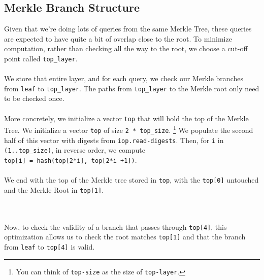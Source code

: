 \documentclass[10pt,letterpaper,titlepage]{article}
\theoremstyle{definition}
\begin{document}
\begin{appendices}
\subsection*{Merkle Branch Structure}
\label{merkle branch}
Given that we're doing lots of queries from the same Merkle Tree, these queries are expected to have quite a bit of overlap close to the root. 
To minimize computation, rather than checking all the way to the root, we choose a cut-off point called \texttt{top\_layer}.\\
\\
We store that entire layer, and for each query, we check our Merkle branches from \texttt{leaf} to \texttt{top\_layer}. 
The paths from \texttt{top\_layer} to the Merkle root only need to be checked once.\\
\\
More concretely, we initialize a vector \texttt{top} that will hold the top of the Merkle Tree. We initialize a vector \texttt{top} of size \texttt{2 * top\_size}.%
\footnote{You can think of \texttt{top-size} as the size of \texttt{top-layer}.} We populate the second half of this vector with digests from \texttt{iop.read-digests}. 
Then, for \texttt{i} in \texttt{(1..top\_size)}, in reverse order, we compute \\
\texttt{top[i] = hash(top[2*i], top[2*i +1])}. \\
\\
We end with the top of the Merkle tree stored in \texttt{top}, with the \texttt{top[0]} untouched and the Merkle Root in \texttt{top[1]}.\\
\begin{figure}[h]
  \centering
{}
\end{figure}\\
\\
Now, to check the validity of a branch that passes through \texttt{top[4]}, this optimization allows us to check the root matches \texttt{top[1]} and that the branch from \texttt{leaf} to \texttt{top[4]} is valid.





\end{appendices}
\end{document}
